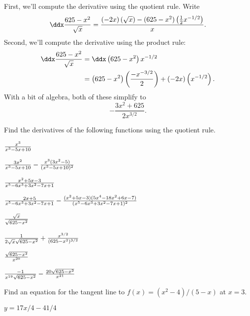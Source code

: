 \begin{solution} 
First, we'll compute the derivative using the quotient rule. Write
\[
\ddx \frac{625-x^2}{\sqrt{x}} = \frac{\left(-2x\right)\left(\sqrt{x}\right) - (625-x^2)\left(\frac{1}{2}x^{-1/2}\right)}{x}.
\]
Second, we'll compute the derivative using the product rule:
\begin{align*}
\ddx \frac{625-x^2}{\sqrt{x}} &= \ddx \left(625-x^2\right)x^{-1/2}\\
&=\left(625-x^2\right)\left(\frac{-x^{-3/2}}{2}\right)+ (-2x)\left(x^{-1/2}\right).
\end{align*}
With a bit of algebra, both of these simplify to
\[
-\frac{3x^2+625}{2x^{3/2}}.
\]
\end{solution}


\begin{exercises}

\noindent Find the derivatives of the following functions using the
quotient rule.

\twocol

\begin{exercise} ${x^3\over x^3-5x+10}$
\begin{answer} ${3x^2\over x^3-5x+10}-{x^3(3x^2-5)\over (x^3-5x+10)^2}$
\end{answer}\end{exercise}

\begin{exercise} ${x^2+5x-3\over x^5-6x^3+3x^2-7x+1}$
\begin{answer} ${2x+5\over x^5-6x^3+3x^2-7x+1}-
{(x^2+5x-3)(5x^4-18x^2+6x-7)\over(x^5-6x^3+3x^2-7x+1)^2}$
\end{answer}\end{exercise}

\ssk
\begin{exercise} ${\sqrt{x}\over\sqrt{625-x^2}}$
\begin{answer} ${1\over 2\sqrt{x}\sqrt{625-x^2}}+{x^{3/2}\over(625-x^2)^{3/2}}$
\end{answer}\end{exercise}

\begin{exercise} ${\sqrt{625-x^2}\over x^{20}}$
\begin{answer} ${-1\over x^{19}\sqrt{625-x^2}}-{20\sqrt{625-x^2}\over x^{21}}$
\end{answer}\end{exercise}

\endtwocol
\bsk

\begin{exercise} Find an equation for the tangent line to $f(x) = (x^2 -
4)/(5-x)$ at $x= 3$.  
\begin{answer} $y=17x/4-41/4$ 
\end{answer}\end{exercise}


\end{exercises}
